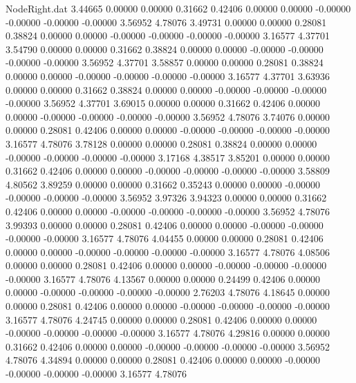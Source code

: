 \begin{filecontents}{NodeRight.dat}
   3.44665    0.00000    0.00000     0.31662    0.42406    0.00000    0.00000   -0.00000   -0.00000   -0.00000   -0.00000    3.56952    4.78076
   3.49731    0.00000    0.00000     0.28081    0.38824    0.00000    0.00000   -0.00000   -0.00000   -0.00000   -0.00000    3.16577    4.37701
   3.54790    0.00000    0.00000     0.31662    0.38824    0.00000    0.00000   -0.00000   -0.00000   -0.00000   -0.00000    3.56952    4.37701
   3.58857    0.00000    0.00000     0.28081    0.38824    0.00000    0.00000   -0.00000   -0.00000   -0.00000   -0.00000    3.16577    4.37701
   3.63936    0.00000    0.00000     0.31662    0.38824    0.00000    0.00000   -0.00000   -0.00000   -0.00000   -0.00000    3.56952    4.37701
   3.69015    0.00000    0.00000     0.31662    0.42406    0.00000    0.00000   -0.00000   -0.00000   -0.00000   -0.00000    3.56952    4.78076
   3.74076    0.00000    0.00000     0.28081    0.42406    0.00000    0.00000   -0.00000   -0.00000   -0.00000   -0.00000    3.16577    4.78076
   3.78128    0.00000    0.00000     0.28081    0.38824    0.00000    0.00000   -0.00000   -0.00000   -0.00000   -0.00000    3.17168    4.38517
   3.85201    0.00000    0.00000     0.31662    0.42406    0.00000    0.00000   -0.00000   -0.00000   -0.00000   -0.00000    3.58809    4.80562
   3.89259    0.00000    0.00000     0.31662    0.35243    0.00000    0.00000   -0.00000   -0.00000   -0.00000   -0.00000    3.56952    3.97326
   3.94323    0.00000    0.00000     0.31662    0.42406    0.00000    0.00000   -0.00000   -0.00000   -0.00000   -0.00000    3.56952    4.78076
   3.99393    0.00000    0.00000     0.28081    0.42406    0.00000    0.00000   -0.00000   -0.00000   -0.00000   -0.00000    3.16577    4.78076
   4.04455    0.00000    0.00000     0.28081    0.42406    0.00000    0.00000   -0.00000   -0.00000   -0.00000   -0.00000    3.16577    4.78076
   4.08506    0.00000    0.00000     0.28081    0.42406    0.00000    0.00000   -0.00000   -0.00000   -0.00000   -0.00000    3.16577    4.78076
   4.13567    0.00000    0.00000     0.24499    0.42406    0.00000    0.00000   -0.00000   -0.00000   -0.00000   -0.00000    2.76203    4.78076
   4.18645    0.00000    0.00000     0.28081    0.42406    0.00000    0.00000   -0.00000   -0.00000   -0.00000   -0.00000    3.16577    4.78076
   4.24745    0.00000    0.00000     0.28081    0.42406    0.00000    0.00000   -0.00000   -0.00000   -0.00000   -0.00000    3.16577    4.78076
   4.29816    0.00000    0.00000     0.31662    0.42406    0.00000    0.00000   -0.00000   -0.00000   -0.00000   -0.00000    3.56952    4.78076
   4.34894    0.00000    0.00000     0.28081    0.42406    0.00000    0.00000   -0.00000   -0.00000   -0.00000   -0.00000    3.16577    4.78076

\end{filecontents}
